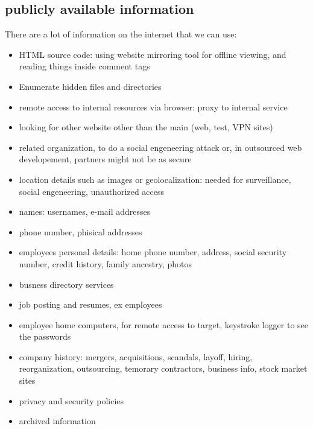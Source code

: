 \subsection{publicly available information}
There are a lot of information on the internet that we can use:
\begin{itemize}
    \item HTML source code: using website mirroring tool for offline viewing, and reading things inside comment tags
    \item Enumerate hidden files and directories
    \item remote access to internal resources via browser: proxy to internal service
    \item looking for other website other than the main (web, test, VPN sites)
    \item related organization, to do a social engeneering attack or, in outsourced web developement, partners might not be as secure
    \item location details such as images or geolocalization: needed for surveillance, social engeneering, unauthorized access
    \item names: usernames, e-mail addresses
    \item phone number, phisical addresses
    \item employees personal details: home phone number, address, social security number, credit history, family ancestry, photos
    \item busness directory services
    \item job posting and resumes, ex employees
    \item employee home computers, for remote access to target, keystroke logger to see the passwords
    \item company history: mergers, acquisitions, scandals, layoff, hiring, reorganization, outsourcing, temorary contractors, business info, stock market sites
    \item privacy and security policies
    \item archived information
\end{itemize}

